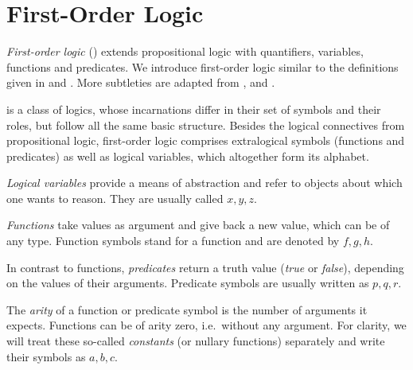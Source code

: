 



    \section{First-Order Logic}
        \label{sec:first-order-logic}

        \emph{First-order logic} (\FOL) extends propositional logic with quantifiers, variables, functions and predicates.
        We introduce first-order logic similar to the definitions given in \cite{Platzer10HybridSystems} and \cite{Huth04LogicInCS}. More subtleties are adapted from \cite{Hodges01ClassicalLogic}, \cite{Buss98HandbookProofTheory} and \cite{Rautenberg10ConciseLogic}.

        \FOL is a class of logics, whose incarnations differ in their set of symbols and their roles, but follow all the same basic structure.
        Besides the logical connectives from propositional logic, first-order logic comprises extralogical symbols (functions and predicates) as well as logical variables, which altogether form its alphabet.

        \emph{Logical variables} provide a means of abstraction and refer to objects about which one wants to reason. They are usually called $x,y,z$. 

        \emph{Functions} take values as argument and give back a new value, which can be of any type. Function symbols stand for a function and are denoted by $f,g,h$.

        In contrast to functions, \emph{predicates} return a truth value (\emph{true} or \emph{false}), depending on the values of their arguments.
        Predicate symbols are usually written as $p,q,r$.

        The \emph{arity} of a function or predicate symbol is the number of arguments it expects.
        Functions can be of arity zero, i.e.\ without any argument.
        For clarity, we will treat these so-called \emph{constants} (or nullary functions) separately and write their symbols as $a,b,c$.


